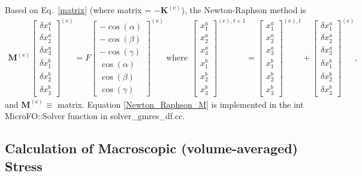 Based on Eq.\ \eqref{matrix} (where matrix = $-\textbf{K}^{(\text{e})}$), the Newton-Raphson method is
%
\begin{eqnarray}
\textbf{M}^{(\text{e})}
%
\begin{bmatrix}
\delta x^a_1 \\ \delta x^a_2 \\ \delta x^a_3 \\ \delta x^b_1 \\ \delta x^b_2 \\ \delta x^b_3
\end{bmatrix}^{(\text{e})} =
%
F\begin{bmatrix}
-\cos(\alpha) \\ -\cos(\beta) \\ -\cos(\gamma) \\ \cos(\alpha) \\ \cos(\beta) \\ \cos(\gamma)
\end{bmatrix}^{(\text{e})}  \ \text{where} \ \
%
\begin{bmatrix}
 x^a_1 \\  x^a_2 \\  x^a_3 \\  x^b_1 \\ x^b_2 \\  x^b_3
\end{bmatrix}^{(\text{e}),t+1}  =
%
\begin{bmatrix}
 x^a_1 \\  x^a_2 \\  x^a_3 \\  x^b_1 \\ x^b_2 \\  x^b_3
\end{bmatrix}^{(\text{e}),t} +
%
\begin{bmatrix}
\delta x^a_1 \\ \delta x^a_2 \\ \delta x^a_3 \\ \delta x^b_1 \\ \delta x^b_2 \\ \delta x^b_3
\end{bmatrix}^{(\text{e})},
%
\label{Newton_Raphson_M}
\end{eqnarray}
% 
and $\textbf{M}^{(\text{e})} \equiv$ matrix. Equation \eqref{Newton_Raphson_M} is implemented in the int MicroFO::Solver function in solver\_gmres\_df.cc. 

\subsection{Calculation of Macroscopic (volume-averaged) Stress}

